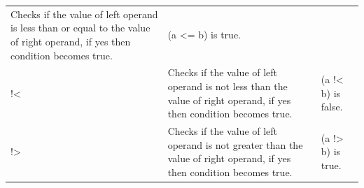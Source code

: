\documentclass[]{book}
\theoremstyle{definition}
\theoremstyle{definition}
\theoremstyle{definition}
\theoremstyle{remark}
\begin{document}
\begin{longtable}[]{@{}lll@{}}
\begin{minipage}[t]{0.69\columnwidth}
Checks if the value of left operand is less than or equal to the value
of right operand, if yes then condition becomes true.\strut
\end{minipage} & \begin{minipage}[t]{0.13\columnwidth}\raggedright
(a \textless{}= b) is true.\strut
\end{minipage}\tabularnewline
\begin{minipage}[t]{0.09\columnwidth}\raggedright
!\textless{}\strut
\end{minipage} & \begin{minipage}[t]{0.69\columnwidth}\raggedright
Checks if the value of left operand is not less than the value of right
operand, if yes then condition becomes true.\strut
\end{minipage} & \begin{minipage}[t]{0.13\columnwidth}\raggedright
(a !\textless{} b) is false.\strut
\end{minipage}\tabularnewline
\begin{minipage}[t]{0.09\columnwidth}\raggedright
!\textgreater{}\strut
\end{minipage} & \begin{minipage}[t]{0.69\columnwidth}\raggedright
Checks if the value of left operand is not greater than the value of
right operand, if yes then condition becomes true.\strut
\end{minipage} & \begin{minipage}[t]{0.13\columnwidth}\raggedright
(a !\textgreater{} b) is true.\strut
\end{minipage}\tabularnewline
\bottomrule
\end{longtable}
\end{document}
